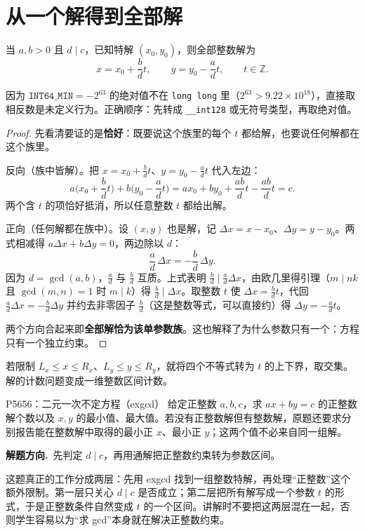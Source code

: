 \documentclass[UTF8,a4paper,11pt,twoside,openright,fontset=fandol]{ctexbook}
\theoremstyle{definition}
\newcommand{\Z}{\mathbb Z}
\newcommand{\hint}{\par\noindent\textbf{解题方向.}\ }
\begin{document}
\section{从一个解得到全部解}
当 $a,b>0$ 且 $d\mid c$，已知特解 $(x_0,y_0)$，则全部整数解为
\[
 x=x_0+\frac bd t,\qquad y=y_0-\frac ad t,\qquad t\in\Z.
\]

\begin{tip}
因为 $\texttt{INT64\_MIN}=-2^{63}$ 的绝对值不在 \texttt{long long} 里（$2^{63}>9.22\times10^{18}$），直接取相反数是未定义行为。正确顺序：先转成 \texttt{\_\_int128} 或无符号类型，再取绝对值。
\end{tip}

\begin{proof}
先看清要证的是\textbf{恰好}：既要说这个族里的每个 $t$ 都给解，也要说任何解都在这个族里。

反向（族中皆解）。把 $x=x_0+\frac bd t$、$y=y_0-\frac ad t$ 代入左边：
\[
 a\Big(x_0+\frac bd t\Big)+b\Big(y_0-\frac ad t\Big)=ax_0+by_0+\frac{ab}{d}t-\frac{ab}{d}t=c.
\]
两个含 $t$ 的项恰好抵消，所以任意整数 $t$ 都给出解。

正向（任何解都在族中）。设 $(x,y)$ 也是解，记 $\Delta x=x-x_0$、$\Delta y=y-y_0$。两式相减得 $a\Delta x+b\Delta y=0$，两边除以 $d$：
\[
 \frac ad\,\Delta x=-\frac bd\,\Delta y.
\]
因为 $d=\gcd(a,b)$，$\frac ad$ 与 $\frac bd$ 互质。上式表明 $\frac bd\mid\frac ad\Delta x$，由欧几里得引理（$m\mid nk$ 且 $\gcd(m,n)=1$ 时 $m\mid k$）得 $\frac bd\mid\Delta x$。取整数 $t$ 使 $\Delta x=\frac bd t$，代回 $\frac ad\Delta x=-\frac bd\Delta y$ 并约去非零因子 $\frac bd$（这是整数等式，可以直接约）得 $\Delta y=-\frac ad t$。

两个方向合起来即\textbf{全部解恰为该单参数族}。这也解释了为什么参数只有一个：方程只有一个独立约束。
\end{proof}
若限制 $L_x\le x\le R_x$、$L_y\le y\le R_y$，就将四个不等式转为 $t$ 的上下界，取交集。解的计数问题变成一维整数区间计数。

\begin{problem}{P5656：二元一次不定方程（exgcd）}
给定正整数 $a,b,c$，求 $ax+by=c$ 的正整数解个数以及 $x,y$ 的最小值、最大值。若没有正整数解但有整数解，原题还要求分别报告能在整数解中取得的最小正 $x$、最小正 $y$；这两个值不必来自同一组解。
\end{problem}
\hint 先判定 $d\mid c$，再用通解把正整数约束转为参数区间。

\begin{pitfall}[讲解：先看这题到底在做什么]
这题真正的工作分成两层：先用 exgcd 找到一组整数特解，再处理“正整数”这个额外限制。第一层只关心 $d\mid c$ 是否成立；第二层把所有解写成一个参数 $t$ 的形式，于是正整数条件自然变成 $t$ 的一个区间。讲解时不要把这两层混在一起，否则学生容易以为“求 gcd”本身就在解决正整数约束。
\end{pitfall}
\end{document}
